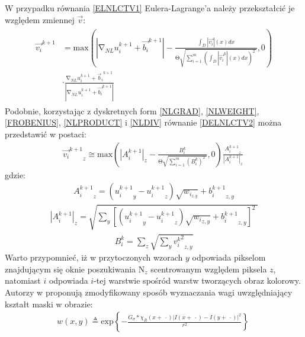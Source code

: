 \documentclass[12pt, twoside, openany]{report}
\theoremstyle{definition}
\begin{document}
W przypadku równania \eqref{ELNLCTV1} Eulera-Lagrange’a należy przekształcić je względem zmiennej $\overrightarrow{v}$:
\begin{align}
\begin{aligned}
{\overrightarrow{v_i}}^{k+1} &= \mathrm{max} \left(\left|{\mathrm{\nabla }}_{NL}u^{k+1}_i+{\overrightarrow{b_i}}^{k+1}\right|-\frac{\int_D{\left|\overrightarrow{v_i}\right|(x)}dx}{\mathrm{\Theta }\sqrt{\sum^m_{i=1}{{\left(\int_D{\left|{\overrightarrow{v_i}}^k\right|(x)}dx\right)}^2}\ }},0\right) \\ 
&\cdot \frac{{\mathrm{\nabla }}_{NL}u^{k+1}_i+{{\overrightarrow{b}}_i}^{k+1}}{\left|{\mathrm{\nabla }}_{NL}u^{k+1}_i+{\overrightarrow{b_i}}^{k+1}\right|}\ 
\label{DELNLCTV2}
\end{aligned}
\end{align}
Podobnie, korzystając z dyskretnych form \eqref{NLGRAD}, \eqref{NLWEIGHT}, \eqref{FROBENIUS}, \eqref{NLPRODUCT} i \eqref{NLDIV} równanie \eqref{DELNLCTV2} można przedstawić w postaci:
\begin{align}
{{\overrightarrow{v_i}}^{k+1}}_z \cong {\mathrm{max} \left({\left|A^{k+1}_i\right|}_z-\frac{B^k_i}{\mathrm{\Theta }\sqrt{\sum^m_{i=1}{{\left(B^k_i\right)}^2}\ }},0\right)\frac{{A^{k+1}_i}_z}{{\left|A^{k+1}_i\right|}_z}\ }
\label{VNLCTVITER}
\end{align}
gdzie:
\begin{align}
{A^{k+1}_i}_z=\left({u^{k+1}_i}_y-{u^{k+1}_i}_z\right)\sqrt{w_{i_{z,y}}}+{b^{k+1}_i}_{z,y}
\end{align} 
\begin{align}
{\left|A^{k+1}_i\right|}_z=\sqrt{\sum_y{{\left[\left({u^{k+1}_i}_y-{u^{k+1}_i}_z\right)\sqrt{{w_i}_{z,y}}+{b^{k+1}_i}_{z,y}\right]}^2}\ }
\end{align}
\begin{align}
B^k_i=\sum_z{\sqrt{\sum_y{{{v^k_i}^2}_{z,y}}}}
\end{align}
Warto przypomnieć, iż w przytoczonych wzorach $y$ odpowiada pikselom znajdującym się oknie poszukiwania ${\mathrm{N}}_z$ scentrowanym względem piksela $z$, natomiast $i$ odpowiada $i$-tej warstwie spośród warstw tworzących obraz kolorowy. Autorzy w \cite{jung2011nonlocal} proponują zmodyfikowany sposób wyznaczania wagi uwzględniający kształt maski w obrazie:
\begin{align}
w\left(x,y\right)\triangleq {\mathrm{exp} \left\{-\frac{G_{\sigma }*{\chi }_R\left(x+\ \cdot \right){\left|I\left(x+\ \cdot \right)-I\left(y+\ \cdot \right)\right|}^2}{r^2}\right\}\ }
\label{NLWEIGHTMASK}
\end{align}
\end{document}
